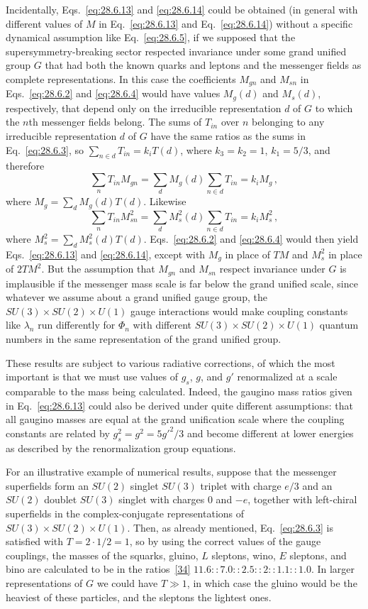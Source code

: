 Incidentally, Eqs.~\eqref{eq:28.6.13} and \eqref{eq:28.6.14} could be
obtained (in general with different values of \(M\) in
Eq.~\eqref{eq:28.6.13} and Eq.~\eqref{eq:28.6.14}) without a specific
dynamical assumption like Eq.~\eqref{eq:28.6.5}, if we supposed that the
supersymmetry-breaking sector respected invariance under some grand
unified group \(G\) that had both the known quarks and leptons and the
messenger fields as complete representations. In this case the
coefficients \(M_{gn}\) and \(M_{sn}\) in Eqs.~\eqref{eq:28.6.2} and
\eqref{eq:28.6.4} would have values \(M_g(d)\) and \(M_s(d)\),
respectively, that depend only on the irreducible representation \(d\) of
\(G\) to which the \(n\)th messenger fields belong. The sums of \(T_{in}\)
over \(n\) belonging to any irreducible representation \(d\) of \(G\)
have the same ratios as the sums in Eq.~\eqref{eq:28.6.3}, so
\(\sum_{n\in d}T_{in}=k_iT(d)\), where \(k_3=k_2=1\), \(k_1=5/3\), and
therefore
\[
  \sum_nT_{in}M_{gn}
  =\sum_dM_g(d)\sum_{n\in d}T_{in}
  =k_iM_g\,,
\]
where \(M_g=\sum_dM_g(d)T(d)\). Likewise
\[
  \sum_nT_{in}M_{sn}^2
  =\sum_dM_s^2(d)\sum_{n\in d}T_{in}
  =k_iM_s^2\,,
\]
where \(M_s^2=\sum_dM_s^2(d)T(d)\).
Eqs.~\eqref{eq:28.6.2} and \eqref{eq:28.6.4} would then yield
Eqs.~\eqref{eq:28.6.13} and \eqref{eq:28.6.14}, except with \(M_g\) in
place of \(TM\) and \(M_s^2\) in place of \(2TM^2\). But the assumption
that \(M_{gn}\) and \(M_{sn}\) respect invariance under \(G\) is implausible
if the messenger mass scale is far below the grand unified scale, since
whatever we assume about a grand unified gauge group, the
\(SU(3)\times SU(2)\times U(1)\) gauge interactions would
make coupling constants like \(\lambda_n\) run differently for \(\Phi_n\)
with different \(SU(3)\times SU(2)\times U(1)\) quantum
numbers in the same representation of the grand unified group.

These results are subject to various radiative corrections, of which the
most important is that we must use values of \(g_s\), \(g\), and \(g'\)
renormalized at a scale comparable to the mass being calculated. Indeed,
the gaugino mass ratios given in Eq.~\eqref{eq:28.6.13} could also be
derived under quite different assumptions: that all gaugino masses are
equal at the grand unification scale where the coupling constants are
related by \(g_s^2=g^2=5g'^2/3\) and become different at lower energies
as described by the renormalization group equations.

For an illustrative example of numerical results, suppose that the
messenger superfields form an \(SU(2)\) singlet \(SU(3)\) triplet with
charge \(e/3\) and an \(SU(2)\) doublet \(SU(3)\) singlet with charges 0
and \(-e\), together with left-chiral superfields in the complex-conjugate
representations of \(SU(3)\times SU(2)\times U(1)\).
Then, as already mentioned, Eq.~\eqref{eq:28.6.3} is satisfied with
\(T=2\mathbin{\cdot}1/2=1\), so by using the correct values of the gauge
couplings, the masses of the squarks, gluino, \(L\) sleptons, wino,
\(E\) sleptons, and bino are calculated to be in the
ratios~\hyperref[ch28-ref-34]{[34]}
\(11.6::7.0::2.5::2::1.1::1.0\). In larger representations of \(G\) we
could have \(T\gg1\), in which case the gluino would be the heaviest of
these particles, and the sleptons the lightest ones.

